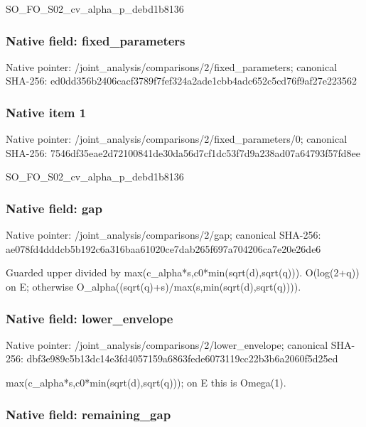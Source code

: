 \documentclass[10pt,a4paper]{article}
\begin{document}
SO\_FO\_S02\_cv\_alpha\_p\_debd1b8136


\subsubsection{Native field: fixed\_parameters}


Native pointer: /joint\_analysis/comparis\allowbreak{}ons/2/fixed\_parameters; canonical SHA-256: ed0dd356b2406cacf3789f7f\allowbreak{}ef324a2ade1cbb4adc652c5c\allowbreak{}d76f9af27e223562



\subsubsection{Native item 1}


Native pointer: /joint\_analysis/comparis\allowbreak{}ons/2/fixed\_parameters/0; canonical SHA-256: 7546df35eae2d72100841de3\allowbreak{}0da56d7cf1dc53f7d9a238ad\allowbreak{}07a64793f57fd8ee


SO\_FO\_S02\_cv\_alpha\_p\_debd1b8136


\subsubsection{Native field: gap}


Native pointer: /joint\_analysis/comparisons/2/gap; canonical SHA-256: ae078fd4dddcb5b192c6a316\allowbreak{}baa61020ce7dab265f697a70\allowbreak{}4206ca7e20e26de6


Guarded upper divided by max(c\_alpha*s,c0*min(sqrt(d),sqrt(q))). O(log(2+q)) on E; otherwise O\_alpha((sqrt(q)+s)/max(\allowbreak{}s,min(sqrt(d),sqrt(q))))\allowbreak{}.


\subsubsection{Native field: lower\_envelope}


Native pointer: /joint\_analysis/comparis\allowbreak{}ons/2/lower\_envelope; canonical SHA-256: dbf3e989c5b13dc14e3fd405\allowbreak{}7159a6863fede6073119cc22\allowbreak{}b3b6a2060f5d25ed


max(c\_alpha*s,c0*min(sqrt(d),sqrt(q))); on E this is Omega(1).


\subsubsection{Native field: remaining\_gap}
\end{document}
